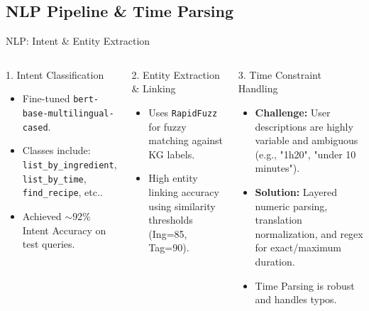 \documentclass[t, 10pt, handout, aspectratio=169]{beamer}
\begin{document}
\subsection{NLP Pipeline \& Time Parsing}
\begin{frame}{NLP: Intent \& Entity Extraction}
  \begin{columns}
      \begin{block}{1. Intent Classification}
        \begin{itemize}
          \item Fine-tuned \texttt{bert-base-multilingual-cased}.
          \item Classes include: \texttt{list\_by\_ingredient}, \texttt{list\_by\_time}, \texttt{find\_recipe}, etc..
          \item Achieved $\sim$92\% Intent Accuracy on test queries.
        \end{itemize}
      \end{block}
      
      \begin{block}{2. Entity Extraction \& Linking}
        \begin{itemize}
          \item Uses \texttt{RapidFuzz} for fuzzy matching against KG labels.
          \item High entity linking accuracy using similarity thresholds (Ing=85, Tag=90).
        \end{itemize}
      \end{block}
      \begin{block}{3. Time Constraint Handling}
        \begin{itemize}
          \item \textbf{Challenge:} User descriptions are highly variable and ambiguous (e.g., "1h20", "under 10 minutes").
          \item \textbf{Solution:} Layered numeric parsing, translation normalization, and regex for exact/maximum duration.
          \item Time Parsing is robust and handles typos.
        \end{itemize}
      \end{block}
  \end{columns}
\end{frame}
\end{document}
